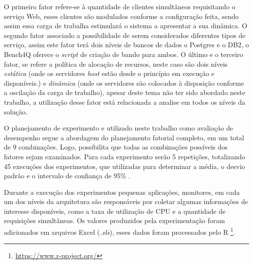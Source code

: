 O primeiro fator refere-se à quantidade de clientes simultâneos requisitando o serviço Web, esses clientes são modulados conforme a configuração feita, sendo assim essa carga de trabalha estimulará o sistema a apresentar a sua dinâmica. O segundo fator associado a possibilidade de serem considerados diferentes tipos de serviço, assim este fator terá dois níveis de bancos de dados o Postgres e o DB2, o Bench4Q oferece o \textit{script} de criação de bando para ambos. O último e o terceiro fator, se refere a política de alocação de recursos, neste caso são dois níveis \textit{estática} (onde os servidores \textit{host} estão desde o princípio em execução e disponíveis.) e \textit{dinâmica} (onde os servidores são colocados à disposição conforme a oscilação da carga de trabalho), apesar deste tema não ter sido abordado neste trabalho, a utilização desse fator está relacionada a analise em todos os níveis da solução.

O planejamento de experimento e utilizado neste trabalho como avaliação de desempenho segue a abordagem do planejamento fatorial completo, em um total de 9 combinações. Logo, possibilita que todas as combinações possíveis dos fatores sejam examinados. Para cada experimento serão 5 repetições, totalizando 45 execuções dos experimentos, que utilizadas para determinar a média, o desvio padrão e o intervalo de confiança de 95\% .

Durante a execução dos experimentos pequenas aplicações, monitores, em cada um dos níveis da arquitetura são responsáveis por coletar algumas informações de interesse disponíveis, como a taxa de utilização de CPU e a quantidade de requisições simultâneas. Os valores produzidos pela experimentação foram adicionados em arquivos Excel (\textit{.xls}), esses dados foram processados pelo R \footnote{\url{https://www.r-project.org/}}.

